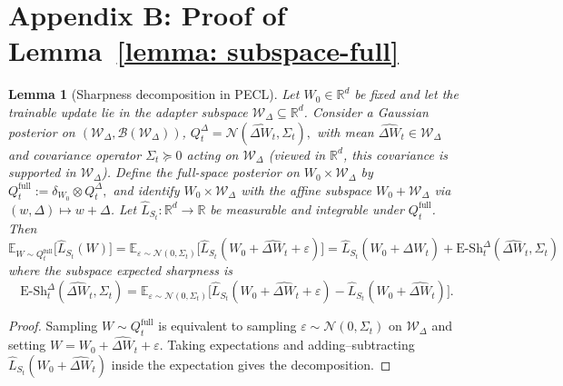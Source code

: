 \documentclass{article} %
\newtheorem{lemma}{Lemma}
\begin{document}
\section{Appendix B: Proof of Lemma~\ref{lemma: subspace-full}}
\begin{lemma}[Sharpness decomposition in PECL]
\label{lemma: Sharpness in PECL}
Let $W_0\in\mathbb R^d$ be fixed and let the trainable update lie in the adapter subspace $\mathcal W_\Delta\subseteq\mathbb R^d$. Consider a Gaussian posterior on $(\mathcal W_\Delta,\mathcal B(\mathcal W_\Delta))$,
 $
 Q_t^{\Delta}=\mathcal N(\hat{\Delta W}_t,\Sigma_t),
 $
 with mean $\hat{\Delta W}_t\in\mathcal W_\Delta$ and covariance operator $\Sigma_t\succeq 0$ acting on $\mathcal W_\Delta$ (viewed in $\mathbb R^d$, this covariance is supported in $\mathcal W_\Delta$). Define the full-space posterior on ${W_0}\times\mathcal W_\Delta$ by
 $
 Q_t^{\mathrm{full}}:=\delta_{W_0}\otimes Q_t^{\Delta},
 $
and identify ${W_0}\times\mathcal W_\Delta$ with the affine subspace $W_0+\mathcal W_\Delta$ via $(w,\Delta)\mapsto w+\Delta$. Let $\hat L_{S_t}:\mathbb R^d\to\mathbb R$ be measurable and integrable under $Q_t^{\mathrm{full}}$. Then
 \[
 \mathbb{E}_{W\sim Q_t^{\mathrm{full}}}\big[\hat{L}_{S_t}(W)\big]
 = \mathbb{E}_{\varepsilon\sim\mathcal N(0,\Sigma_t)}
 \big[\hat{L}_{S_t}(W_0+\hat{\Delta W}_t+\varepsilon)\big]
 = \hat{L}_{S_t}(W_0+\hat{\Delta W}_t) +\mathrm{E\text{-}Sh}_t^{\Delta}(\hat{\Delta W}_t,\Sigma_t) \]
   where the subspace expected sharpness is
   \[
   \mathrm{E\text{-}Sh}_t^{\Delta}(\hat{\Delta W}_t,\Sigma_t)
   = \mathbb{E}_{\varepsilon\sim\mathcal N(0,\Sigma_t)}
   \big[\hat{L}_{S_t}(W_0+\hat{\Delta W}_t+\varepsilon)
  - \hat{L}_{S_t}(W_0+\hat{\Delta W}_t)\big].
     \]
\end{lemma}
\begin{proof}
    Sampling $W\sim Q_t^{\mathrm{full}}$ is equivalent to sampling $\varepsilon\sim\mathcal N(0,\Sigma_t)$ on $\mathcal W_\Delta$ and setting $W=W_0+\hat{\Delta W}_t+\varepsilon$. Taking expectations and adding–subtracting $\hat L_{S_t}(W_0+\hat{\Delta W}_t)$ inside the expectation gives the decomposition. 
\end{proof}
\end{document}
